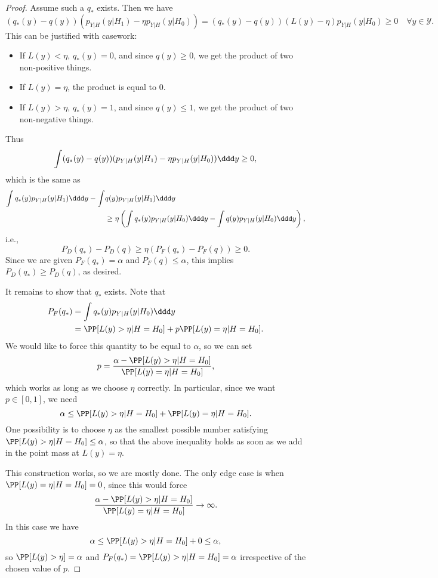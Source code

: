 \begin{proof}
Assume such a $q_*$ exists. Then we have 
\[(q_*(y) - q(y))(p_{Y|H}(y|H_1) - \eta p_{Y|H}(y|H_0)) = (q_*(y) - q(y))(L(y) - \eta)p_{Y|H}(y|H_0)\geq 0\quad \forall y\in \mathcal{Y}.\] 
This can be justified with casework: 
\begin{itemize}
	\item If $L(y) < \eta$, $q_*(y) = 0$, and since $q(y)\geq 0$, we get the product of two non-positive things.
	\item If $L(y) = \eta$, the product is equal to $0$.
	\item If $L(y) > \eta$, $q_*(y) = 1$, and since $q(y)\leq 1$, we get the product of two non-negative things.
\end{itemize}
Thus 
\[\int (q_*(y) - q(y))(p_{Y|H}(y|H_1) - \eta p_{Y|H}(y|H_0))\ddd y \geq 0,\]
which is the same as 
\begin{align*}
	\int q_*(y)p_{Y|H}(y|H_1)\ddd y - \int & q(y) p_{Y|H}(y|H_1)\ddd y \\
	&\geq \eta \left(\int q_*(y) p_{Y|H}(y|H_0)\ddd y - \int q(y) p_{Y|H}(y|H_0)\ddd y\right),
\end{align*}
i.e., 
\[P_D(q_*) - P_D(q) \geq \eta(P_F(q_*) - P_F(q)) \geq 0.\] 
Since we are given $P_F(q_*) = \alpha$ and $P_F(q)\leq \alpha$, this implies $P_D(q_*)\geq P_D(q)$, as desired.

\V 

It remains to show that $q_*$ exists. Note that
\begin{align*}
	P_F(q_*) &= \int q_*(y) p_{Y|H}(y|H_0)\ddd y \\
					 &= \PP[L(y) > \eta|H=H_0] + p\PP[L(y)=\eta|H=H_0].
\end{align*}
We would like to force this quantity to be equal to $\alpha$, so we can set 
\[p = \frac{\alpha - \PP[L(y) > \eta | H=H_0]}{\PP[L(y) = \eta|H=H_0]},\]
which works as long as we choose $\eta$ correctly. In particular, since we want $p\in [0,1]$, we need 
\[\alpha \leq \PP[L(y) > \eta | H=H_0] + \PP[L(y) = \eta | H=H_0].\]
One possibility is to choose $\eta$ as the smallest possible number satisfying $\PP[L(y) > \eta | H=H_0]\leq \alpha$, so that the above inequality holds as soon as we add in the point mass at $L(y)=\eta$. 

This construction works, so we are mostly done. The only edge case is when $\PP[L(y)=\eta|H=H_0]=0$, since this would force 
\[\frac{\alpha - \PP[L(y) > \eta | H=H_0]}{\PP[L(y) = \eta | H = H_0]}\rightarrow \infty.\]
In this case we have 
\[\alpha \leq \PP[L(y) > \eta | H=H_0] + 0 \leq \alpha,\] 
so $\PP[L(y) > \eta] = \alpha$ and $P_F(q_*) = \PP[L(y) > \eta | H = H_0] = \alpha$ irrespective of the chosen value of $p$. 
\end{proof}

